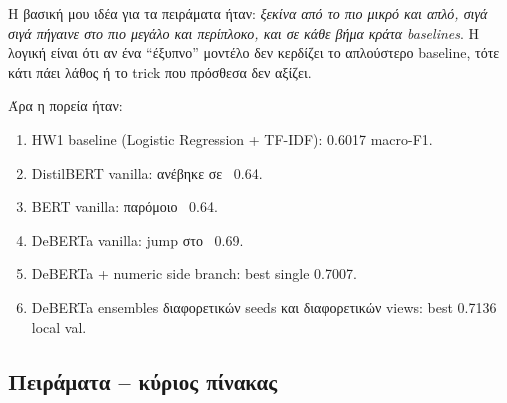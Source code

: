 \documentclass[12pt]{fphw}
\begin{document}
Η βασική μου ιδέα για τα πειράματα ήταν: \emph{ξεκίνα από το πιο μικρό και απλό, σιγά σιγά πήγαινε στο πιο μεγάλο και περίπλοκο, και σε κάθε βήμα κράτα baselines}. Η λογική είναι ότι αν ένα ``έξυπνο'' μοντέλο δεν κερδίζει το απλούστερο baseline, τότε κάτι πάει λάθος ή το trick που πρόσθεσα δεν αξίζει.

Άρα η πορεία ήταν:
\begin{enumerate}
    \item HW1 baseline (Logistic Regression + TF-IDF): 0.6017 macro-F1.
    \item DistilBERT vanilla: ανέβηκε σε ~0.64.
    \item BERT vanilla: παρόμοιο ~0.64.
    \item DeBERTa vanilla: jump στο ~0.69.
    \item DeBERTa + numeric side branch: best single 0.7007.
    \item DeBERTa ensembles διαφορετικών seeds και διαφορετικών views: best 0.7136 local val.
\end{enumerate}

\subsection{Πειράματα -- κύριος πίνακας}
\end{document}
